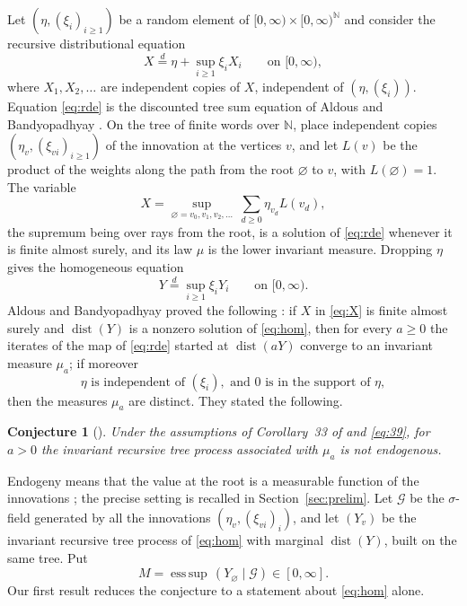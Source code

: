 \documentclass[11pt]{amsart}
\newtheorem{conjecture}[theorem]{Conjecture}
\theoremstyle{remark}
\newcommand{\Ga}{\mathcal{G}}
\newcommand{\N}{\mathbb{N}}
\newcommand{\esssup}{\operatorname*{ess\,sup}}
\newcommand{\dist}{\operatorname{dist}}
\begin{document}
Let $(\eta,(\xi_i)_{i\ge 1})$ be a random element of $[0,\infty)\times[0,\infty)^{\N}$ and
consider the recursive distributional equation
\begin{equation}\label{eq:rde}
X\stackrel{d}{=}\eta+\sup_{i\ge 1}\xi_i X_i \qquad\text{on } [0,\infty),
\end{equation}
where $X_1,X_2,\dots$ are independent copies of $X$, independent of $(\eta,(\xi_i))$.
Equation \eqref{eq:rde} is the discounted tree sum equation of Aldous and Bandyopadhyay
\cite[Section~4.4]{AB}. On the tree of finite words over $\N$, place independent copies
$(\eta_v,(\xi_{vi})_{i\ge1})$ of the innovation at the vertices $v$, and let $L(v)$ be the
product of the weights along the path from the root $\varnothing$ to $v$, with
$L(\varnothing)=1$. The variable
\begin{equation}\label{eq:X}
X=\sup_{\varnothing=v_0,v_1,v_2,\dots}\ \sum_{d\ge 0}\eta_{v_d}L(v_d),
\end{equation}
the supremum being over rays from the root, is a solution of \eqref{eq:rde} whenever it is
finite almost surely, and its law $\mu$ is the lower invariant measure. Dropping $\eta$
gives the homogeneous equation
\begin{equation}\label{eq:hom}
Y\stackrel{d}{=}\sup_{i\ge 1}\xi_i Y_i\qquad\text{on } [0,\infty).
\end{equation}
Aldous and Bandyopadhyay proved the following \cite[Corollary~33]{AB}: if $X$ in
\eqref{eq:X} is finite almost surely and $\dist(Y)$ is a nonzero solution of
\eqref{eq:hom}, then for every $a\ge 0$ the iterates of the map of \eqref{eq:rde} started
at $\dist(aY)$ converge to an invariant measure $\mu_a$; if moreover
\begin{equation}\label{eq:39}
\eta \text{ is independent of } (\xi_i), \text{ and } 0 \text{ is in the support of } \eta,
\end{equation}
then the measures $\mu_a$ are distinct. They stated the following.

\begin{conjecture}[{\cite[Conjecture~34]{AB}}]\label{conj}
Under the assumptions of Corollary~33 of \cite{AB} and \eqref{eq:39}, for $a>0$ the
invariant recursive tree process associated with $\mu_a$ is not endogenous.
\end{conjecture}

Endogeny means that the value at the root is a measurable function of the innovations
\cite[Definition~7]{AB}; the precise setting is recalled in Section~\ref{sec:prelim}.
Let $\Ga$ be the $\sigma$-field generated by all the innovations
$(\eta_v,(\xi_{vi})_i)$, and let $(Y_v)$ be the invariant recursive tree process of
\eqref{eq:hom} with marginal $\dist(Y)$, built on the same tree. Put
\[
M=\esssup\,(Y_\varnothing\mid \Ga)\in[0,\infty].
\]
Our first result reduces the conjecture to a statement about \eqref{eq:hom} alone.
\end{document}

